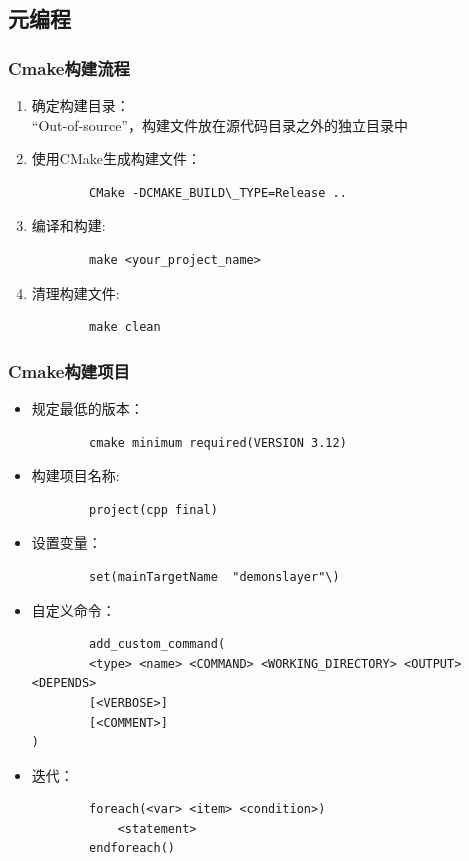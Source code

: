 \documentclass[a4paper,12pt]{article}
\begin{document}
\subsection{\color{red}元编程}
\subsubsection{\color{green}Cmake构建流程}
\begin{enumerate}
    \item 确定构建目录：\\“Out-of-source”，构建文件放在源代码目录之外的独立目录中
    \item 使用CMake生成构建文件：
    \begin{verbatim}
        CMake -DCMAKE_BUILD\_TYPE=Release ..
    \end{verbatim}
    \item 编译和构建:
    \begin{verbatim}
        make <your_project_name>
    \end{verbatim}
    \item 清理构建文件:
    \begin{verbatim}
        make clean
    \end{verbatim}
\end{enumerate}
\subsubsection{\color{green}Cmake构建项目}
\begin{itemize}
    \item 规定最低的版本：
    \begin{verbatim}
        cmake minimum required(VERSION 3.12)
    \end{verbatim}
    \item 构建项目名称: 
    \begin{verbatim}
        project(cpp final)
    \end{verbatim}
    \item 设置变量：
    \begin{verbatim}
        set(mainTargetName  "demonslayer"\)
    \end{verbatim}
    \item 自定义命令：
    \begin{verbatim}
        add_custom_command(
        <type> <name> <COMMAND> <WORKING_DIRECTORY> <OUTPUT> <DEPENDS>
        [<VERBOSE>]
        [<COMMENT>]
)
    \end{verbatim}
    \item 迭代：
    \begin{verbatim}
        foreach(<var> <item> <condition>)
            <statement>
        endforeach()
    \end{verbatim}
\end{itemize}
\end{document}
